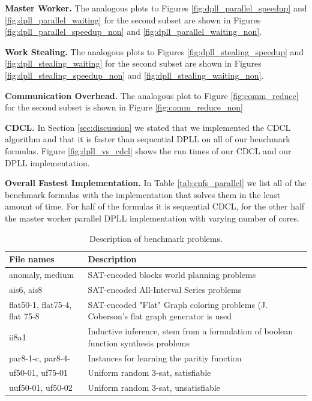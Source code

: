\documentclass[letterpaper]{article}
\newcommand{\mypar}[1]{{\bf #1.}}
\begin{document}
\mypar{Master Worker}
The analogous plots to Figures \ref{fig:dpll_parallel_speedup} and \ref{fig:dpll_parallel_waiting} for the second subset are shown in Figures \ref{fig:dpll_parallel_speedup_non} and \ref{fig:dpll_parallel_waiting_non}.

\mypar{Work Stealing}
The analogous plots to Figures \ref{fig:dpll_stealing_speedup} and \ref{fig:dpll_stealing_waiting} for the second subset are shown in Figures \ref{fig:dpll_stealing_speedup_non} and \ref{fig:dpll_stealing_waiting_non}.

\mypar{Communication Overhead}
The analogous plot to Figure \ref{fig:comm_reduce} for the second subset is shown in Figure \ref{fig:comm_reduce_non}

\mypar{CDCL}
In Section \ref{sec:discussion} we stated that we implemented the CDCL algorithm and that it is faster than sequential DPLL on all of our benchmark formulas.
Figure \ref{fig:dpll_vs_cdcl} shows the run times of our CDCL and our DPLL implementation.

\mypar{Overall Fastest Implementation}
In Table \ref{tab:cnfs_parallel} we list all of the benchmark formulas with the implementation that solves them in the least amount of time.
For half of the formulas it is sequential CDCL, for the other half the master worker parallel DPLL implementation with varying number of cores.

\begin{table}[h]
    \centering
    \begin{tabularx}{\columnwidth}{|p{2.6cm}|X|}
        \hline
        File names & Description\\
        \hline
        \hline
        anomaly, medium & SAT-encoded blocks world planning problems\\
        \hline
        ais6, ais8 & SAT-encoded All-Interval Series problems\\
        \hline
        flat50-1, flat75-4, flat 75-8 & SAT-encoded "Flat" Graph coloring problems (J. Coberson's flat graph generator is used\\
        \hline
        ii8a1 & Inductive inference, stem from a formulation of boolean function synthesis problems\\
        \hline
        par8-1-c, par8-4- & Instances for learning the paritiy function\\
        \hline
        uf50-01, uf75-01 & Uniform random 3-sat, satisfiable\\
        \hline
        uuf50-01, uf50-02 & Uniform random 3-sat, unsatisfiable\\
        \hline
    \end{tabularx}
    \caption{Description of benchmark problems.}
    \label{tab:benchmark_set}
\end{table}
\end{document}
